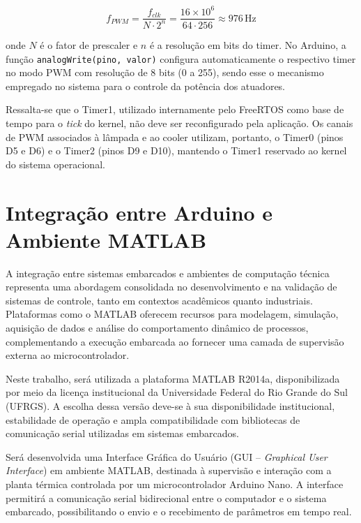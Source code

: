\documentclass[repeatfields,xlists,xpacks,oneside]{ufrgscca}
\begin{document}
\begin{equation}
    f_{PWM} = \frac{f_{clk}}{N \cdot 2^n}
            = \frac{16\times10^6}{64 \cdot 256}
            \approx 976\,\text{Hz}
\end{equation}

onde $N$ é o fator de prescaler e $n$ é a resolução em bits do timer. No Arduino, a função \texttt{analogWrite(pino, valor)} configura automaticamente o respectivo timer no modo PWM com resolução de 8 bits (0 a 255), sendo esse o mecanismo empregado no sistema para o controle da potência dos atuadores.

Ressalta-se que o Timer1, utilizado internamente pelo FreeRTOS como base de tempo para o \textit{tick} do kernel, não deve ser reconfigurado pela aplicação. Os canais de PWM associados à lâmpada e ao cooler utilizam, portanto, o Timer0 (pinos D5 e D6) e o Timer2 (pinos D9 e D10), mantendo o Timer1 reservado ao kernel do sistema operacional.

\section{Integração entre Arduino e Ambiente MATLAB}

A integração entre sistemas embarcados e ambientes de computação técnica representa
uma abordagem consolidada no desenvolvimento e na validação de sistemas de controle,
tanto em contextos acadêmicos quanto industriais. Plataformas como o MATLAB
\cite{mathworks_matlab} oferecem recursos para modelagem, simulação, aquisição de dados
e análise do comportamento dinâmico de processos, complementando a execução
embarcada ao fornecer uma camada de supervisão externa ao microcontrolador.

Neste trabalho, será utilizada a plataforma MATLAB R2014a, disponibilizada por meio
da licença institucional da Universidade Federal do Rio Grande do Sul (UFRGS). A escolha
dessa versão deve-se à sua disponibilidade institucional, estabilidade de operação e ampla
compatibilidade com bibliotecas de comunicação serial utilizadas em sistemas embarcados.

Será desenvolvida uma Interface Gráfica do Usuário (GUI -- \textit{Graphical User Interface})
em ambiente MATLAB, destinada à supervisão e interação com a planta térmica controlada
por um microcontrolador Arduino Nano. A interface permitirá a comunicação serial
bidirecional entre o computador e o sistema embarcado, possibilitando o envio e o
recebimento de parâmetros em tempo real.
\end{document}
